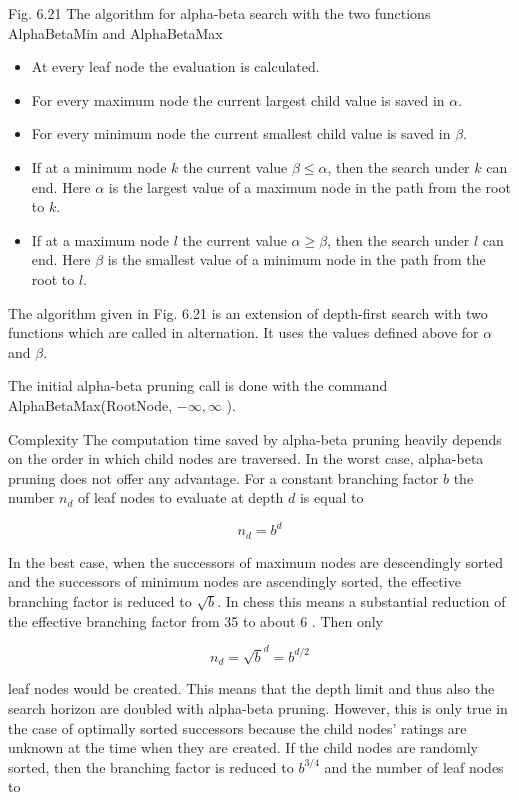 \documentclass[10pt]{article}
\begin{document}
Fig. 6.21 The algorithm for alpha-beta search with the two functions AlphaBetaMin and AlphaBetaMax

\begin{itemize}
  \item At every leaf node the evaluation is calculated.
  \item For every maximum node the current largest child value is saved in $\alpha$.
  \item For every minimum node the current smallest child value is saved in $\beta$.
  \item If at a minimum node $k$ the current value $\beta \leq \alpha$, then the search under $k$ can end. Here $\alpha$ is the largest value of a maximum node in the path from the root to $k$.
  \item If at a maximum node $l$ the current value $\alpha \geq \beta$, then the search under $l$ can end. Here $\beta$ is the smallest value of a minimum node in the path from the root to $l$.
\end{itemize}

The algorithm given in Fig. 6.21 is an extension of depth-first search with two functions which are called in alternation. It uses the values defined above for $\alpha$ and $\beta$.

The initial alpha-beta pruning call is done with the command\\
AlphaBetaMax(RootNode, $-\infty, \infty$ ).

Complexity The computation time saved by alpha-beta pruning heavily depends on the order in which child nodes are traversed. In the worst case, alpha-beta\\
pruning does not offer any advantage. For a constant branching factor $b$ the number $n_{d}$ of leaf nodes to evaluate at depth $d$ is equal to

$$
n_{d}=b^{d}
$$

In the best case, when the successors of maximum nodes are descendingly sorted and the successors of minimum nodes are ascendingly sorted, the effective branching factor is reduced to $\sqrt{b}$. In chess this means a substantial reduction of the effective branching factor from 35 to about 6 . Then only

$$
n_{d}=\sqrt{b}^{d}=b^{d / 2}
$$

leaf nodes would be created. This means that the depth limit and thus also the search horizon are doubled with alpha-beta pruning. However, this is only true in the case of optimally sorted successors because the child nodes' ratings are unknown at the time when they are created. If the child nodes are randomly sorted, then the branching factor is reduced to $b^{3 / 4}$ and the number of leaf nodes to
\end{document}
